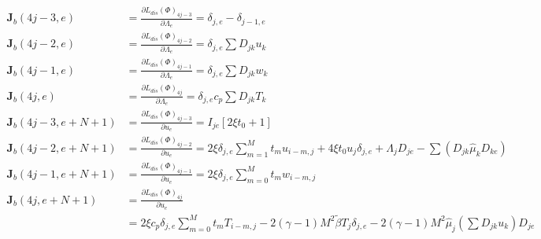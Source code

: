 \begin{equation*}\label{}
  \begin{aligned}\label{}
    \mathbf{J}_b(4j - 3,e) &= \frac{{\partial L_  {dis} \left( \Phi  \right)_{4j - 3} }}{{\partial \Lambda_e }} = \delta _{j,e}  - \delta _{j - 1,e} \\
    \mathbf{J}_b(4j - 2,e) &= \frac{{\partial L_{dis} \left( \Phi  \right)_{4j - 2} }}{{\partial \Lambda_e }} = \delta _{j,e} \sum {D_{jk} u_k }\\
    \mathbf{J}_b(4j - 1,e) &= \frac{{\partial L_{dis} \left( \Phi  \right)_{4j - 1} }}{{\partial \Lambda_e }} = \delta _{j,e} \sum {D_{jk} w_k }\\
    \mathbf{J}_b(4j,e) &= \frac{{\partial L_{dis} \left( \Phi  \right)_{4j} }}{{\partial \Lambda_e }} = \delta _{j,e} c_p \sum {D_{jk} T_k }\\
    \mathbf{J}_b(4j - 3,e + N + 1) &= \frac{{\partial L_{dis} \left( \Phi  \right)_{4j - 3} }}{{\partial u_e }} = I_{je} \left[ {2\xi t_0  + 1} \right]\\
    \mathbf{J}_b(4j - 2,e + N + 1) &= \frac{{\partial L_{dis} \left( \Phi  \right)_{4j - 2} }}{{\partial u_e }} = 2\xi \delta _{j,e} \sum\limits_{m = 1}^M {t_m u_{i - m,j} }  + 4\xi t_0 u_j \delta _{j,e}  + \Lambda_j D_{je}  - \sum {\left( {D_{jk} \hat \mu _k D_{ke} } \right)}\\
    \mathbf{J}_b(4j - 1,e + N + 1) &= \frac{{\partial L_{dis} \left( \Phi  \right)_{4j - 1} }}{{\partial u_e }} = 2\xi \delta _{j,e} \sum\limits_{m = 0}^M {t_m w_{i - m,j} }\\
    \mathbf{J}_b(4j,e + N + 1) &= \frac{{\partial L_{dis} \left( \Phi  \right)_{4j} }}{{\partial u_e }} \\
    &= 2\xi c_p \delta _{j,e} \sum\limits_{m = 0}^M {t_m T_{i - m,j} }  - 2(\gamma  - 1)M^2 \tilde \beta T_j \delta _{j,e}  - 2(\gamma  - 1)M^2 \hat \mu _j \left( {\sum {D_{jk} u_k } } \right)D_{je}
  \end{aligned}
\end{equation*}
